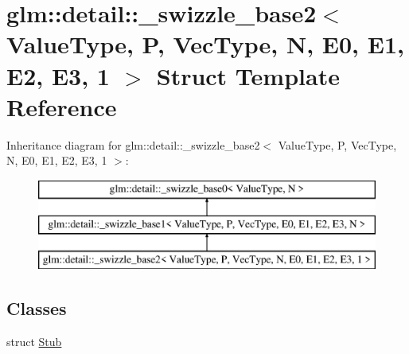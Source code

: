 \hypertarget{structglm_1_1detail_1_1__swizzle__base2_3_01_value_type_00_01_p_00_01_vec_type_00_01_n_00_01_e0_fc19218d69dc8988a4a57fbe7f79725c}{}\section{glm\+:\+:detail\+:\+:\+\_\+swizzle\+\_\+base2$<$ Value\+Type, P, Vec\+Type, N, E0, E1, E2, E3, 1 $>$ Struct Template Reference}
\label{structglm_1_1detail_1_1__swizzle__base2_3_01_value_type_00_01_p_00_01_vec_type_00_01_n_00_01_e0_fc19218d69dc8988a4a57fbe7f79725c}
Inheritance diagram for glm\+:\+:detail\+:\+:\+\_\+swizzle\+\_\+base2$<$ Value\+Type, P, Vec\+Type, N, E0, E1, E2, E3, 1 $>$\+:\begin{figure}[H]
\begin{center}
\leavevmode
\includegraphics[height=3.000000cm]{structglm_1_1detail_1_1__swizzle__base2_3_01_value_type_00_01_p_00_01_vec_type_00_01_n_00_01_e0_fc19218d69dc8988a4a57fbe7f79725c}
\end{center}
\end{figure}
\subsection*{Classes}
\begin{DoxyCompactItemize}
\item 
struct \hyperlink{structglm_1_1detail_1_1__swizzle__base2_3_01_value_type_00_01_p_00_01_vec_type_00_01_n_00_01_e0_17279995be88bc842083eed40758473c}{Stub}
\end{DoxyCompactItemize}
